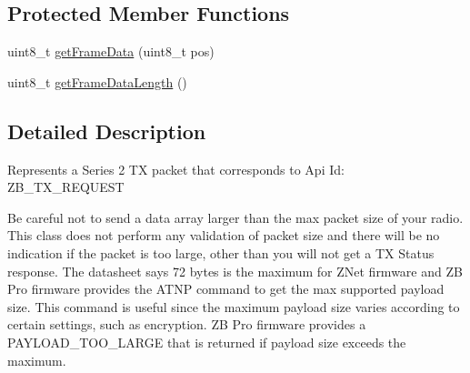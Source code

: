 \subsection*{\-Protected \-Member \-Functions}
\begin{DoxyCompactItemize}
\item 
uint8\-\_\-t \hyperlink{classZBTxRequest_ac81e09dfbf7aefbdf7f8b4838b643c5c}{get\-Frame\-Data} (uint8\-\_\-t pos)
\item 
uint8\-\_\-t \hyperlink{classZBTxRequest_a8e6914c1f556981a0f863c57c57d053b}{get\-Frame\-Data\-Length} ()
\end{DoxyCompactItemize}


\subsection{\-Detailed \-Description}
\-Represents a \-Series 2 \-T\-X packet that corresponds to \-Api \-Id\-: \-Z\-B\-\_\-\-T\-X\-\_\-\-R\-E\-Q\-U\-E\-S\-T

\-Be careful not to send a data array larger than the max packet size of your radio. \-This class does not perform any validation of packet size and there will be no indication if the packet is too large, other than you will not get a \-T\-X \-Status response. \-The datasheet says 72 bytes is the maximum for \-Z\-Net firmware and \-Z\-B \-Pro firmware provides the \-A\-T\-N\-P command to get the max supported payload size. \-This command is useful since the maximum payload size varies according to certain settings, such as encryption. \-Z\-B \-Pro firmware provides a \-P\-A\-Y\-L\-O\-A\-D\-\_\-\-T\-O\-O\-\_\-\-L\-A\-R\-G\-E that is returned if payload size exceeds the maximum. 

